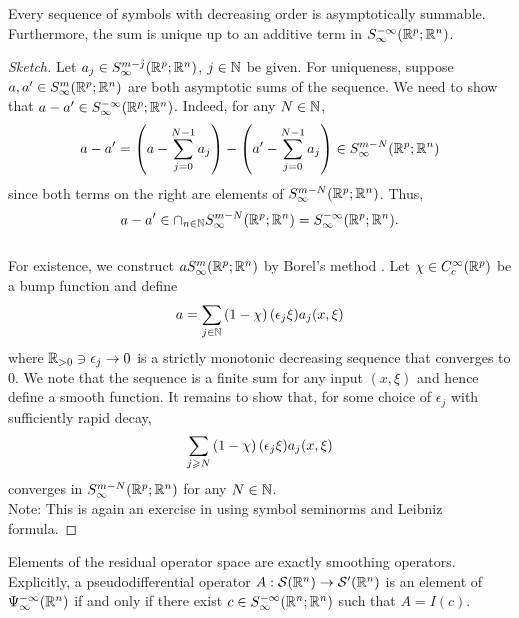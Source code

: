 \documentclass[12pt]{article}
\begin{document}
\begin{flemma}
    Every sequence of symbols with decreasing order is asymptotically summable.  Furthermore, the sum is unique up to an additive term in $S^{-\infty}_\infty({\mathbb R}^{p}; {\mathbb R}^n)$. 
\end{flemma}
\begin{proof}[Sketch]
    Let $a_j \in S^{m-j}_\infty({\mathbb R}^{p}; {\mathbb R}^n)$, $j \in {\ensuremath {\mathbb N}}$ be given. For uniqueness, suppose $a, a' \in S^{m}_\infty({\mathbb R}^{p}; {\mathbb R}^n)$ are both asymptotic sums of the sequence. We need to show that $a - a' \in S^{-\infty}_\infty({\mathbb R}^{p}; {\mathbb R}^n)$. Indeed, for any $N \in {\ensuremath {\mathbb N}}$, 
    \begin{align*}
        a - a' = \left(a - \sum_{j = 0}^{N -1} a_j \right) - \left(a' - \sum_{j = 0}^{N -1} a_j \right) \in S^{m -N}_\infty({\mathbb R}^{p}; {\mathbb R}^n)
    \end{align*}
    since both terms on the right are elements of $S^{m -N}_\infty({\mathbb R}^{p}; {\mathbb R}^n)$. Thus, 
    $$a - a' \in \cap_{n \in {\ensuremath {\mathbb N}}} S^{m -N}_\infty({\mathbb R}^{p}; {\mathbb R}^n) = S^{-\infty}_\infty({\mathbb R}^{p}; {\mathbb R}^n).$$ 
    \\
    For existence, we construct $a S^{m}_\infty({\mathbb R}^{p}; {\mathbb R}^n)$ by Borel's method \cite{}. Let $\chi \in C^{\infty}_c({\mathbb R}^p)$ be a bump function and define
    \begin{align*}
        a = \sum_{j \in {\ensuremath {\mathbb N}}} \left(1 - \chi\right)(\epsilon_j \xi) a_j(x, \xi)
    \end{align*}
    where ${\mathbb R}_{> 0} \ni \epsilon_j \to 0 $ is a strictly monotonic decreasing sequence that converges to $0$. We note that the sequence is a finite sum for any input $(x, \xi)$ and hence define a smooth function. It remains to show that, for some choice of $\epsilon_j$ with sufficiently rapid decay, 
    \begin{align*}
        \sum_{j \geqslant N} \left(1 - \chi\right)(\epsilon_j \xi) a_j(x, \xi) 
    \end{align*}
    converges in $S^{m -N}_\infty({\mathbb R}^{p}; {\mathbb R}^n)$ for any $N \in {\ensuremath {\mathbb N}}$. 
    \\
    
    Note: This is again an exercise in using symbol seminorms and Leibniz formula.  
\end{proof}


\begin{fprop}
    Elements of the residual operator space are exactly smoothing operators. Explicitly, a pseudodifferential operator $A : \mathcal{S}({\mathbb R}^n) \to \mathcal{S}'({\mathbb R}^n)$ is an element of $\Psi^{-\infty}_{\infty}({\mathbb R}^n)$ if and only if there exist $c \in S^{-\infty}_{\infty}({\mathbb R}^{n}; {\mathbb R}^{n})$ such that $A = I(c)$. 
\end{fprop}
\end{document}
